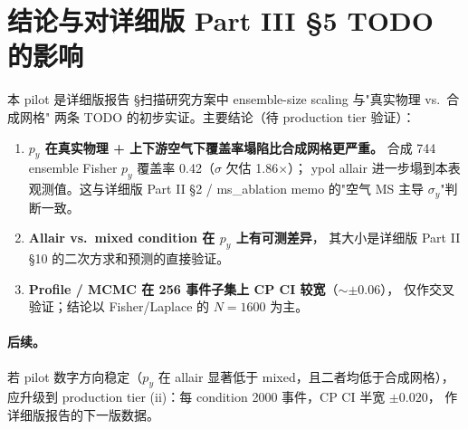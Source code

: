 \documentclass[a4paper,11pt]{article}
\begin{document}
\section{结论与对详细版 Part III §5 TODO 的影响}

本 pilot 是详细版报告 §扫描研究方案中 ensemble-size scaling 与"真实物理 vs.\ 合成网格"
两条 TODO 的初步实证。主要结论（待 production tier 验证）：

\begin{enumerate}
\item \textbf{$p_y$ 在真实物理 + 上下游空气下覆盖率塌陷比合成网格更严重。}
  合成 744 ensemble Fisher $p_y$ 覆盖率 0.42（$\sigma$ 欠估 1.86$\times$）；
  ypol allair 进一步塌到本表观测值。这与详细版 Part II §2 / ms\_ablation
  memo 的"空气 MS 主导 $\sigma_y$"判断一致。
\item \textbf{Allair vs.\ mixed condition 在 $p_y$ 上有可测差异}，
  其大小是详细版 Part II §10 的二次方求和预测的直接验证。
\item \textbf{Profile / MCMC 在 256 事件子集上 CP CI 较宽}（$\sim \pm 0.06$），
  仅作交叉验证；结论以 Fisher/Laplace 的 $N=1600$ 为主。
\end{enumerate}

\paragraph{后续。}
若 pilot 数字方向稳定（$p_y$ 在 allair 显著低于 mixed，且二者均低于合成网格），
应升级到 production tier (ii)：每 condition 2000 事件，CP CI 半宽 $\pm 0.020$，
作详细版报告的下一版数据。
\end{document}

